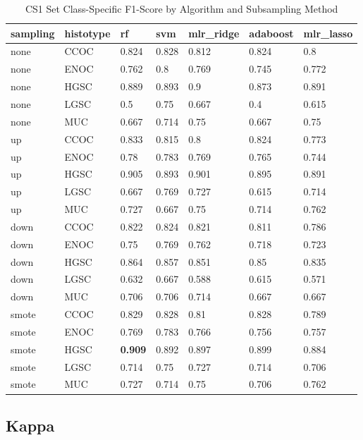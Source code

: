 \documentclass[
]{report}
\begin{document}
\begin{table}

\caption{\label{tab:cs1-f1-class-table}CS1 Set Class-Specific F1-Score by Algorithm and Subsampling Method}
\centering
\begin{tabular}[t]{l|l|l|l|l|l|l}
\hline
sampling & histotype & rf & svm & mlr\_ridge & adaboost & mlr\_lasso\\
\hline
none & CCOC & 0.824 & 0.828 & 0.812 & 0.824 & 0.8\\
\hline
none & ENOC & 0.762 & 0.8 & 0.769 & 0.745 & 0.772\\
\hline
none & HGSC & 0.889 & 0.893 & 0.9 & 0.873 & 0.891\\
\hline
none & LGSC & 0.5 & 0.75 & 0.667 & 0.4 & 0.615\\
\hline
none & MUC & 0.667 & 0.714 & 0.75 & 0.667 & 0.75\\
\hline
up & CCOC & 0.833 & 0.815 & 0.8 & 0.824 & 0.773\\
\hline
up & ENOC & 0.78 & 0.783 & 0.769 & 0.765 & 0.744\\
\hline
up & HGSC & 0.905 & 0.893 & 0.901 & 0.895 & 0.891\\
\hline
up & LGSC & 0.667 & 0.769 & 0.727 & 0.615 & 0.714\\
\hline
up & MUC & 0.727 & 0.667 & 0.75 & 0.714 & 0.762\\
\hline
down & CCOC & 0.822 & 0.824 & 0.821 & 0.811 & 0.786\\
\hline
down & ENOC & 0.75 & 0.769 & 0.762 & 0.718 & 0.723\\
\hline
down & HGSC & 0.864 & 0.857 & 0.851 & 0.85 & 0.835\\
\hline
down & LGSC & 0.632 & 0.667 & 0.588 & 0.615 & 0.571\\
\hline
down & MUC & 0.706 & 0.706 & 0.714 & 0.667 & 0.667\\
\hline
smote & CCOC & 0.829 & 0.828 & 0.81 & 0.828 & 0.789\\
\hline
smote & ENOC & 0.769 & 0.783 & 0.766 & 0.756 & 0.757\\
\hline
smote & HGSC & \textbf{0.909} & 0.892 & 0.897 & 0.899 & 0.884\\
\hline
smote & LGSC & 0.714 & 0.75 & 0.727 & 0.714 & 0.706\\
\hline
smote & MUC & 0.727 & 0.714 & 0.75 & 0.706 & 0.762\\
\hline
\end{tabular}
\end{table}

\hypertarget{kappa-2}{%
\subsection{Kappa}\label{kappa-2}}
\end{document}
